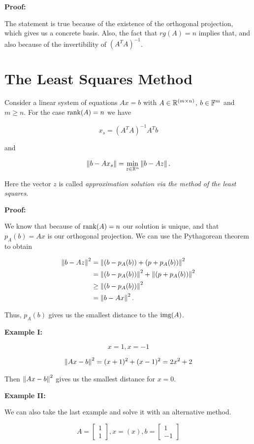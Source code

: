 \textbf{Proof:}

The statement is true because of the existence of the orthogonal projection, which gives us a concrete basis. Also, 
the fact that \(rg(A) = n\) implies that, and also because of the invertibility of \({(A^T A)}^{-1}\).

\QED

\section{The Least Squares Method}

Consider a linear system of equations \(Ax=b\) with \(A \in \mathbb{R}^{(m \times n)}\), 
\(b \in \mathbb{F}^m\) and \(m \ge n\). For the case \(\mathrm{rank}(A) = n\) we have

\[
	x_s = {(A^T A)}^{-1} A^T b
\]

and 

\[
	\left\|  b - Ax_s  \right\| = \min_{z \in \mathbb{R}^n} \left\|  b - Az  \right\|.
\]

Here the vector \(z\) is called \emph{approximation solution via the method of the least squares}.

\textbf{Proof:}

We know that because of \(\mathrm{rank}(A) = n\) our solution is unique, and that \(p_A(b) = Ax\) is our orthogonal 
projection. We can use the Pythagorean theorem to obtain

\begin{align*}
	\left\|  b - Az  \right\|^2 &= \left\|  (b  - p_A (b))  + (p + p_A(b))  \right\|^2 \\
				&=  \left\|  (b  - p_A (b)) \right\|^2  +\left\| (p + p_A(b))  \right\|^2 \\
				&\ge  \left\|  (b  - p_A (b)) \right\|^2 \\
				&= \left\|  b - Ax  \right\|^2.
\end{align*}

Thus, \(p_A(b)\) gives us the smallest distance to the \(\mathrm{img}(A)\).

\QED

\textbf{Example I:}

\[
	x = 1, x = -1
\]

\[
	\left\|  Ax - b  \right\|^2 = (x + 1)^2 + (x - 1)^2 = 2x^2 + 2 
\]

Then \(\left\|  Ax - b  \right\|^2\) gives us the smallest distance for \(x = 0\).

\textbf{Example II:}

We can also take the last example and solve it with an alternative method.

\[
	A = \begin{bmatrix} 1 \\ 1 \end{bmatrix}, x = (x), b = \begin{bmatrix} 1 \\ -1 \end{bmatrix}
\]

